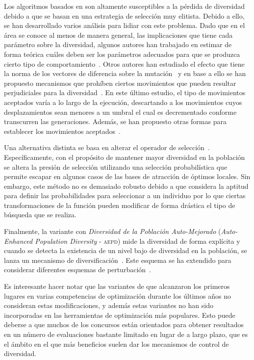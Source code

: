 Los algoritmos basados en \DE{} son altamente susceptibles a la pérdida de diversidad debido a que se basan en una estrategia de selección muy elitista.
%
Debido a ello, se han desarrollado varios análisis para lidiar con este problema.
%
Dado que en el área se conoce al menos de manera general, las implicaciones que tiene cada parámetro sobre la diversidad, algunos autores han trabajado
en estimar de forma teórica cuáles deben ser los parámetros adecuados para que se produzca cierto tipo de comportamiento~\cite{zaharie2003control}.
%
Otros autores han estudiado el efecto que tiene la norma de los vectores de diferencia sobre la mutación~\cite{montgomery2009differential} y en base
a ello se han propuesto mecanismos que prohíben ciertos movimientos que pueden resultar perjudiciales para la diversidad~\cite{montgomery2012simple}.
%
En este último estudio, el tipo de movimientos aceptados varía a lo largo de la ejecución, descartando a los movimientos cuyos desplazamientos sean menores
a un umbral el cual es decrementado conforme transcurren las generaciones.
%
Además, se han propuesto otras formas para establecer los movimientos aceptados~\cite{bolufe2013differential}.

Una alternativa distinta se basa en alterar el operador de selección~\cite{sa2008exploration}.
%
Específicamente, con el propósito de mantener mayor diversidad en la población se altera la presión de selección utilizando una selección probabilística que
permite escapar en algunos casos de las bases de atracción de óptimos locales.
%
Sin embargo, este método no es demasiado robusto debido a que considera la aptitud para definir las probabilidades para seleccionar a un individuo por lo que ciertas 
transformaciones de la función pueden modificar de forma drástica el tipo de búsqueda que se realiza.

Finalmente, la variante \DE{} con \textit{Diversidad de la Población Auto-Mejorado} (\textit{Auto-Enhanced Population Diversity} - \textsc{aepd}) 
mide la diversidad de forma explícita y cuando se detecta la existencia de un nivel bajo de diversidad en la población, se 
lanza un mecanismo de diversificación~\cite{yang2015differential}.
%
Este esquema se ha extendido para considerar diferentes esquemas de perturbación~\cite{zhao2016differential}.

Es interesante hacer notar que las variantes de \DE{} que alcanzaron los primeros lugares en varias competencias de optimización durante los últimos años
no consideran estas modificaciones, y además estas variantes no han sido incorporadas en las herramientas de optimización más populares.
%
Esto puede deberse a que muchos de los concursos están orientados para obtener resultados en un número de evaluaciones bastante limitado en lugar de a largo plazo,
que es el ámbito en el que más beneficios suelen dar los mecanismos de control de diversidad.


